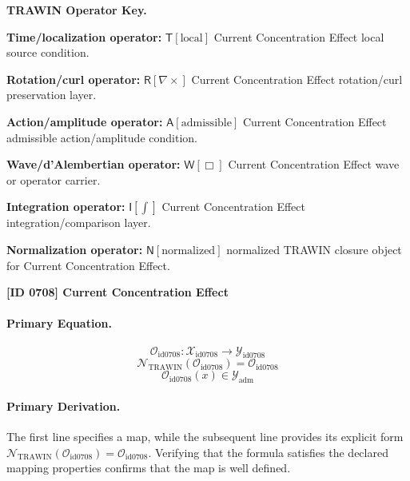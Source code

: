 \par\vspace{0.45\baselineskip}
\noindent\begin{minipage}[t]{\linewidth}
\begingroup
\small
\raggedright
\textbf{TRAWIN Operator Key.}\par
\noindent\textbf{Time/localization operator:} $\mathsf{T}\!\left[\mathrm{local}\right]$ Current Concentration Effect local source condition.\par
\noindent\textbf{Rotation/curl operator:} $\mathsf{R}\!\left[\nabla\times\right]$ Current Concentration Effect rotation/curl preservation layer.\par
\noindent\textbf{Action/amplitude operator:} $\mathsf{A}\!\left[\mathrm{admissible}\right]$ Current Concentration Effect admissible action/amplitude condition.\par
\noindent\textbf{Wave/d'Alembertian operator:} $\mathsf{W}\!\left[\Box\right]$ Current Concentration Effect wave or operator carrier.\par
\noindent\textbf{Integration operator:} $\mathsf{I}\!\left[\int\right]$ Current Concentration Effect integration/comparison layer.\par
\noindent\textbf{Normalization operator:} $\mathsf{N}\!\left[\mathrm{normalized}\right]$ normalized TRAWIN closure object for Current Concentration Effect.\par
\endgroup
\end{minipage}

\clearpage
\noindent\textbf{[ID 0708] Current Concentration Effect}\par
\vspace{0.35em}
\paragraph{Primary Equation.}
\[
\mathcal{O}_{\mathrm{id0708}}:\mathcal{X}_{\mathrm{id0708}}\longrightarrow\mathcal{Y}_{\mathrm{id0708}}
\]
\[
\mathcal{N}_{\mathrm{TRAWIN}}(\mathcal{O}_{\mathrm{id0708}})=\mathcal{O}_{\mathrm{id0708}}
\]
\[
\mathcal{O}_{\mathrm{id0708}}(x)\in\mathcal{Y}_{\mathrm{adm}}
\]

\paragraph{Primary Derivation.}
The first line specifies a map, while the subsequent line provides its explicit form \( \mathcal{N}_{\mathrm{TRAWIN}}(\mathcal{O}_{\mathrm{id0708}})=\mathcal{O}_{\mathrm{id0708}} \). Verifying that the formula satisfies the declared mapping properties confirms that the map is well defined.

